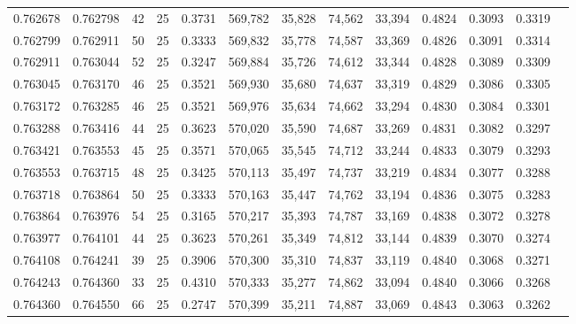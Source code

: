 \begin{tabular}{rrrrrrrrrrrrr}
0.762678 & 0.762798 &    42 &  25 &                                     0.3731 & 569,782 &  35,828 &  74,562 &  33,394 & 0.4824 & 0.3093 & 0.3319 \\
0.762799 & 0.762911 &    50 &  25 &                                     0.3333 & 569,832 &  35,778 &  74,587 &  33,369 & 0.4826 & 0.3091 & 0.3314 \\
0.762911 & 0.763044 &    52 &  25 &                                     0.3247 & 569,884 &  35,726 &  74,612 &  33,344 & 0.4828 & 0.3089 & 0.3309 \\
0.763045 & 0.763170 &    46 &  25 &                                     0.3521 & 569,930 &  35,680 &  74,637 &  33,319 & 0.4829 & 0.3086 & 0.3305 \\
0.763172 & 0.763285 &    46 &  25 &                                     0.3521 & 569,976 &  35,634 &  74,662 &  33,294 & 0.4830 & 0.3084 & 0.3301 \\
0.763288 & 0.763416 &    44 &  25 &                                     0.3623 & 570,020 &  35,590 &  74,687 &  33,269 & 0.4831 & 0.3082 & 0.3297 \\
0.763421 & 0.763553 &    45 &  25 &                                     0.3571 & 570,065 &  35,545 &  74,712 &  33,244 & 0.4833 & 0.3079 & 0.3293 \\
0.763553 & 0.763715 &    48 &  25 &                                     0.3425 & 570,113 &  35,497 &  74,737 &  33,219 & 0.4834 & 0.3077 & 0.3288 \\
0.763718 & 0.763864 &    50 &  25 &                                     0.3333 & 570,163 &  35,447 &  74,762 &  33,194 & 0.4836 & 0.3075 & 0.3283 \\
0.763864 & 0.763976 &    54 &  25 &                                     0.3165 & 570,217 &  35,393 &  74,787 &  33,169 & 0.4838 & 0.3072 & 0.3278 \\
0.763977 & 0.764101 &    44 &  25 &                                     0.3623 & 570,261 &  35,349 &  74,812 &  33,144 & 0.4839 & 0.3070 & 0.3274 \\
0.764108 & 0.764241 &    39 &  25 &                                     0.3906 & 570,300 &  35,310 &  74,837 &  33,119 & 0.4840 & 0.3068 & 0.3271 \\
0.764243 & 0.764360 &    33 &  25 &                                     0.4310 & 570,333 &  35,277 &  74,862 &  33,094 & 0.4840 & 0.3066 & 0.3268 \\
0.764360 & 0.764550 &    66 &  25 &                                     0.2747 & 570,399 &  35,211 &  74,887 &  33,069 & 0.4843 & 0.3063 & 0.3262 \\

\end{tabular}
